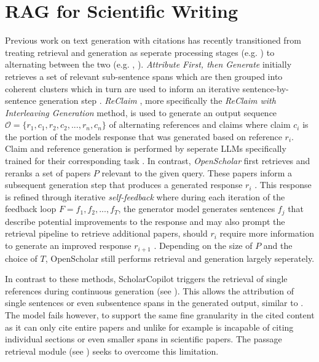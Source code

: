 \section{RAG for Scientific Writing}\label{rag-scientific-writing}
Previous work on text generation with citations has recently transitioned from treating retrieval and generation as seperate processing stages (e.g. \cite{slobodkin2024attribute}) to alternating between the two (e.g. \cite{xia2024ground}, \cite{asai2024openscholar}). \emph{Attribute First, then Generate} \cite{slobodkin2024attribute} initially retrieves a set of relevant sub-sentence spans which are then grouped into coherent clusters which in turn are used to inform an iterative sentence-by-sentence generation step \cite{slobodkin2024attribute}. \emph{ReClaim} \cite{xia2024ground}, more specifically the \emph{ReClaim with Interleaving Generation} method, is used to generate an output sequence $\mathcal{O}=\{r_1,c_1,r_2,c_2,...,r_n,c_n\}$ of alternating references and claims where claim $c_i$ is the portion of the models response that was generated based on reference $r_i$. Claim and reference generation is performed by seperate LLMs specifically trained for their corresponding task \cite{xia2024ground}. In contrast, \emph{OpenScholar} \cite{asai2024openscholar} first retrieves and reranks a set of papers $P$ relevant to the given query. These papers inform a subsequent generation step that produces a generated response $r_i$ \cite{asai2024openscholar}. This response is refined through iterative \emph{self-feedback} where during each iteration of the feedback loop $F=f_1,f_2,...,f_T$, the generator model generates sentences $f_j$ that describe potential improvements to the response and may also prompt the retrieval pipeline to retrieve additional papers, should $r_i$ require more information to generate an improved response $r_{i+1}$ \cite{asai2024openscholar}. Depending on the size of $P$ and the choice of $T$, OpenScholar still performs retrieval and generation largely seperately.

In contrast to these methods, ScholarCopilot triggers the retrieval of single references during continuous generation (see ). This allows the attribution of single sentences or even subsentence spans in the generated output, similar to \cite{xia2024ground,slobodkin2024attribute}. The model fails however, to support the same fine granularity in the cited content as it can only cite entire papers and unlike for example \cite{zhang2024longcite} is incapable of citing individual sections or even smaller spans in scientific papers. The passage retrieval module (see ) seeks to overcome this limitation.


